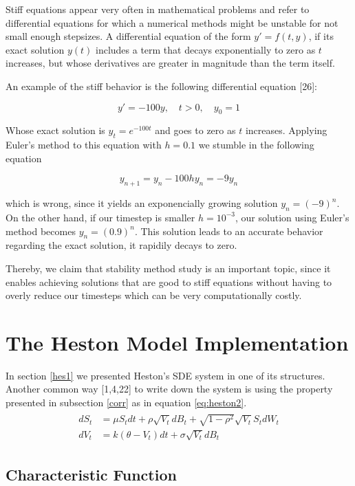 \documentclass[12pt,twoside]{reedthesis}
\theoremstyle{definition}
\theoremstyle{definition}
\theoremstyle{remark}
\begin{document}
  Stiff equations appear very often in mathematical problems and refer to
  differential equations for which a numerical methods might be unstable
  for not small enough stepsizes. A differential equation of the form
  \(y' = f(t,y)\), if its exact solution \(y(t)\) includes a term that
  decays exponentially to zero as \(t\) increases, but whose derivatives
  are greater in magnitude than the term itself.
  
  An example of the stiff behavior is the following differential equation
  {[}26{]}:
  
  \[y' = -100y, \,\,\,\,\,\, t > 0, \,\,\,\,\,\, y_0 = 1\]
  
  Whose exact solution is \(y_t = e^{-100 t}\) and goes to zero as \(t\)
  increases. Applying Euler's method to this equation with \(h=0.1\) we
  stumble in the following equation
  
  \[ y_{n+1} = y_{n} - 100 h y_{n} = -9y_{n}\]
  
  which is wrong, since it yields an exponencially growing solution
  \(y_n = (-9)^n\). On the other hand, if our timestep is smaller
  \(h = 10^{-3}\), our solution using Euler's method becomes
  \(y_n = (0.9)^n\). This solution leads to an accurate behavior regarding
  the exact solution, it rapidily decays to zero.
  
  Thereby, we claim that stability method study is an important topic,
  since it enables achieving solutions that are good to stiff equations
  without having to overly reduce our timesteps which can be very
  computationally costly.
  
  \chapter{The Heston Model
  Implementation}\label{the-heston-model-implementation}
  
  In section \ref{hes1} we presented Heston's SDE system in one of its
  structures. Another common way {[}1,4,22{]} to write down the system is
  using the property presented in subsection \ref{corr} as in equation
  \eqref{eq:heston2}.
  \begin{align}
  \label{eq:heston2}
  \begin{split}
  dS_t &= \mu S_t dt + \rho \sqrt{V_t} dB_t + \sqrt{1 - \rho^2} \sqrt{V_t} S_t dW_t \\
  dV_t &= k(\theta - V_t)dt + \sigma \sqrt{V_t} dB_t 
  \end{split}
  \end{align}
  \section{Characteristic Function}\label{characteristic-function}
  
\end{document}
